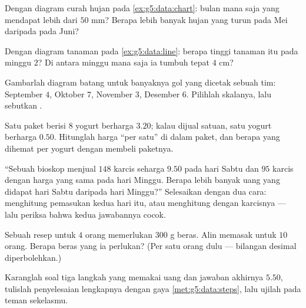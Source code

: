 \begin{exercise}[$\star$]\label{exo:g5:data:5}
Dengan diagram curah hujan pada \cref{ex:g5:data:chart}: bulan mana
saja yang mendapat lebih dari $50$ mm? Berapa lebih banyak hujan
yang turun pada Mei daripada pada Juni?
\end{exercise}

\begin{exercise}[$\star$]\label{exo:g5:data:6}
Dengan diagram tanaman pada \cref{ex:g5:data:line}: berapa tinggi
tanaman itu pada minggu $2$? Di antara minggu mana saja ia tumbuh
tepat $4$ cm?
\end{exercise}

\begin{exercise}[$\star$]\label{exo:g5:data:7}
Gambarlah diagram batang untuk banyaknya gol yang dicetak sebuah
tim: September $4$, Oktober $7$, November $3$, Desember $6$.
Pilihlah skalanya, lalu sebutkan .
\end{exercise}

\begin{exercise}[$\star$]\label{exo:g5:data:8}
Satu paket berisi $8$ yogurt berharga $3.20$; kalau dijual satuan,
satu yogurt berharga $0.50$. Hitunglah harga ``per satu'' di dalam
paket, dan berapa yang dihemat per yogurt dengan membeli paketnya.
\end{exercise}

\begin{exercise}[$\star\star$]\label{exo:g5:data:9}
``Sebuah bioskop menjual $148$ karcis seharga $9.50$ pada hari Sabtu
dan $95$ karcis dengan harga yang sama pada hari Minggu. Berapa
lebih banyak uang yang didapat hari Sabtu daripada hari Minggu?''
Selesaikan dengan dua cara: menghitung pemasukan kedua hari itu,
atau menghitung dengan \emph{} karcisnya --- lalu periksa
bahwa kedua jawabannya cocok.
\end{exercise}

\begin{exercise}[$\star\star$]\label{exo:g5:data:10}
Sebuah resep untuk $4$ orang memerlukan $300$ g beras. Alin memasak
untuk $10$ orang. Berapa beras yang ia perlukan? (Per satu orang
dulu --- bilangan desimal diperbolehkan.)
\end{exercise}

\begin{exercise}[$\star\star$]\label{exo:g5:data:11}
Karanglah soal tiga langkah yang memakai uang dan jawaban akhirnya
$5.50$, tulislah penyelesaian lengkapnya dengan gaya
\cref{met:g5:data:steps}, lalu ujilah pada teman sekelasmu.

\end{exercise}
